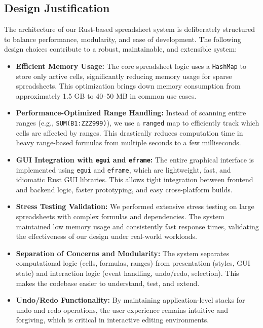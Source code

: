 \documentclass{article}
\begin{document}
\subsection{Design Justification}
\label{sec:justification}

The architecture of our Rust-based spreadsheet system is deliberately structured to balance performance, modularity, and ease of development. The following design choices contribute to a robust, maintainable, and extensible system:

\begin{itemize}
    \item \textbf{Efficient Memory Usage:} The core spreadsheet logic uses a \texttt{HashMap} to store only active cells, significantly reducing memory usage for sparse spreadsheets. This optimization brings down memory consumption from approximately 1.5 GB to 40--50 MB in common use cases.

    \item \textbf{Performance-Optimized Range Handling:} Instead of scanning entire ranges (e.g., \texttt{SUM(B1:ZZZ999)}), we use a \texttt{ranged} map to efficiently track which cells are affected by ranges. This drastically reduces computation time in heavy range-based formulas from multiple seconds to a few milliseconds.

    \item \textbf{GUI Integration with \texttt{egui} and \texttt{eframe}:} The entire graphical interface is implemented using \texttt{egui} and \texttt{eframe}, which are lightweight, fast, and idiomatic Rust GUI libraries. This allows tight integration between frontend and backend logic, faster prototyping, and easy cross-platform builds.

    \item \textbf{Stress Testing Validation:} We performed extensive stress testing on large spreadsheets with complex formulas and dependencies. The system maintained low memory usage and consistently fast response times, validating the effectiveness of our design under real-world workloads.

    \item \textbf{Separation of Concerns and Modularity:} The system separates computational logic (cells, formulas, ranges) from presentation (styles, GUI state) and interaction logic (event handling, undo/redo, selection). This makes the codebase easier to understand, test, and extend.

    \item \textbf{Undo/Redo Functionality:} By maintaining application-level stacks for undo and redo operations, the user experience remains intuitive and forgiving, which is critical in interactive editing environments.


\end{itemize}
\end{document}
